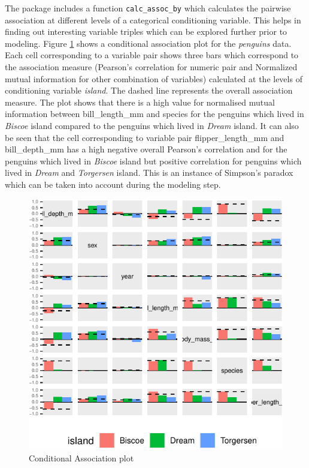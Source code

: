 The package includes a function \texttt{calc\_assoc\_by} which
calculates the pairwise association at different levels of a categorical
conditioning variable. This helps in finding out interesting variable
triples which can be explored further prior to modeling. Figure
\ref{fig:cond-assoc} shows a conditional association plot for the
\emph{penguins} data. Each cell corresponding to a variable pair shows
three bars which correspond to the association measure (Pearson's
correlation for numeric pair and Normalized mutual information for other
combination of variables) calculated at the levels of conditioning
variable \emph{island}. The dashed line represents the overall
association measure. The plot shows that there is a high value for
normalised mutual information between bill\_length\_mm and species for
the penguins which lived in \emph{Biscoe} island compared to the
penguins which lived in \emph{Dream} island. It can also be seen that
the cell corresponding to variable pair flipper\_length\_mm and
bill\_depth\_mm has a high negative overall Pearson's correlation and
for the penguins which lived in \emph{Biscoe} island but positive
correlation for penguins which lived in \emph{Dream} and
\emph{Torgersen} island. This is an instance of Simpson's paradox which
can be taken into account during the modeling step.

\begin{Schunk}
\begin{figure}

{\centering \includegraphics{rj_paper_files/figure-latex/cond-assoc-1} 

}

\caption[Conditional Association plot]{Conditional Association plot}\label{fig:cond-assoc}
\end{figure}
\end{Schunk}

